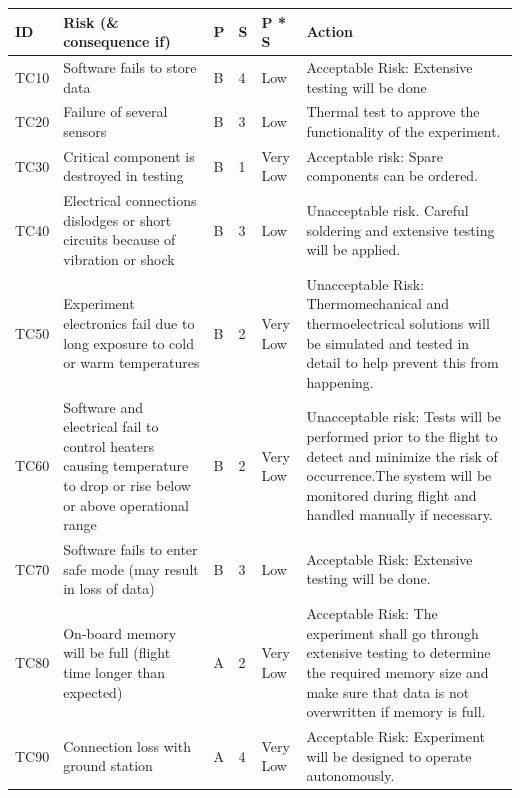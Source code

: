 \documentclass[a4paper,12pt,twoside]{article}
\begin{document}
\begin{landscape}
\begin{longtable}{|m{}| m{} |m{} |m{}|m{}| m{}|}

\hline
\textbf{ID} & \textbf{Risk (\& consequence if)} & \textbf{P} & \textbf{S} & \textbf{P * S} & \textbf{Action} \\ \hline
TC10 & Software fails to store data & B & 4 & \cellcolor[HTML]{FCFF2F}Low & Acceptable Risk: Extensive testing will be done \\ \hline
TC20 & Failure of several sensors & B & 3 & \cellcolor[HTML]{FCFF2F}Low & Thermal test to approve the functionality of the experiment. \\ \hline
TC30 & Critical component is destroyed in testing & B & 1 & \cellcolor[HTML]{34FF34}Very Low & Acceptable risk: Spare components can be ordered. \\ \hline
TC40 & Electrical connections dislodges or short circuits because of vibration or shock & B & 3 & \cellcolor[HTML]{FCFF2F}Low & Unacceptable risk. Careful soldering and extensive testing will be applied. \\ \hline
TC50 & Experiment electronics fail due to long exposure to cold or warm temperatures & B & 2 & \cellcolor[HTML]{34FF34}Very Low & Unacceptable Risk: Thermomechanical and thermoelectrical solutions will be simulated and tested in detail to help prevent this from happening. \\ \hline
TC60 & Software and electrical fail to control heaters causing temperature to drop or rise below or above operational range & B & 2 & \cellcolor[HTML]{34FF34}Very Low & Unacceptable risk: Tests will be performed prior to the flight to detect and minimize the risk of occurrence.The system will be monitored during flight and handled manually if necessary. \\ \hline
TC70 & Software fails to enter safe mode (may result in loss of data) & B & 3 & \cellcolor[HTML]{FCFF2F}Low & Acceptable Risk: Extensive testing will be done. \\ \hline
TC80 & On-board memory will be full (flight time longer than expected) & A & 2 & \cellcolor[HTML]{34FF34}Very Low & Acceptable Risk: The experiment shall go through extensive testing to determine the required memory size and make sure that data is not overwritten if memory is full. \\ \hline
TC90 & Connection loss with ground station & A & 4 & \cellcolor[HTML]{34FF34}Very Low & Acceptable Risk: Experiment will be designed to operate autonomously. \\ \hline

\end{longtable}
\end{landscape}
\end{document}
